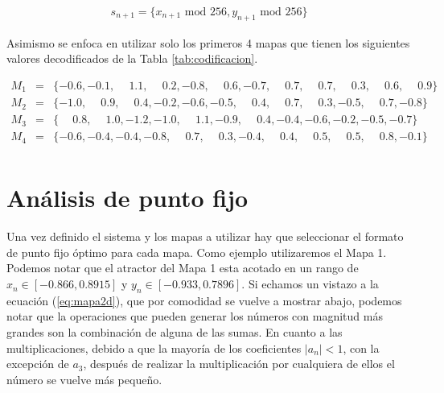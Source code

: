        \begin{equation}
            \begin{array}{lcl}
                s_{n+1} = \{ x_{n+1} \text{ mod } 256, y_{n+1} \text{ mod } 256 \}
            \end{array}
            \label{eq:extraccion}
        \end{equation}

       Asimismo se enfoca en utilizar solo los primeros 4 mapas que tienen los siguientes valores decodificados de la Tabla \ref{tab:codificacion}.

          \begin{equation*}
             \begin{array}{lcl}
                M_{1} & = & \{ -0.6, -0.1, \phantom{-}1.1, \phantom{-}0.2, -0.8, \phantom{-}0.6, -0.7, \phantom{-}0.7, \phantom{-}0.7, \phantom{-}0.3, \phantom{-}0.6, \phantom{-}0.9 \}\\
                M_{2} & = & \{ -1.0, \phantom{-}0.9, \phantom{-}0.4, -0.2, -0.6, -0.5, \phantom{-}0.4, \phantom{-}0.7, \phantom{-}0.3, -0.5, \phantom{-}0.7, -0.8 \}\\
                M_{3} & = &  \{\phantom{-}0.8, \phantom{-}1.0, -1.2, -1.0, \phantom{-}1.1, -0.9, \phantom{-}0.4, -0.4, -0.6, -0.2, -0.5, -0.7 \}\\
                M_{4} & = & \{-0.6, -0.4, -0.4, -0.8, \phantom{-}0.7, \phantom{-}0.3, -0.4, \phantom{-}0.4, \phantom{-}0.5, \phantom{-}0.5, \phantom{-}0.8, -0.1 \}\\
            \end{array}
        \end{equation*}

    \section{Análisis de punto fijo}

        Una vez definido el sistema y los mapas a utilizar hay que seleccionar el formato de punto fijo óptimo para cada mapa. Como ejemplo utilizaremos el Mapa 1. Podemos notar que el atractor del Mapa 1 esta acotado en un rango de $x_{n} \in [-0.866, 0.8915]$ y $y_{n} \in [-0.933, 0.7896]$. Si echamos un vistazo a la ecuación (\ref{eq:mapa2d}), que por comodidad se vuelve a mostrar abajo, podemos notar que la operaciones que pueden generar los números con magnitud más grandes son la combinación de alguna de las sumas. En cuanto a las multiplicaciones, debido a que la mayoría de los coeficientes $|a_{n}| < 1$, con la excepción de $a_{3}$, después de realizar la multiplicación por cualquiera de ellos el número se vuelve más pequeño.

